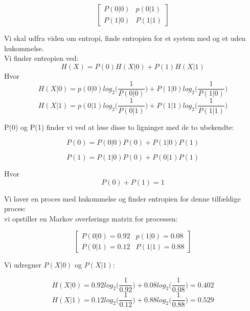 \[ \left[ \begin{array}{ccc}
P(0|0) & p(0|1)  \\
P(1|0) & P(1|1) \end{array} \right]\] 

Vi skal udfra viden om entropi, finde entropien for et system med og et uden hukommelse.\\
Vi finder entropien ved:
\begin{equation}
H(X) = P(0)H(X|0)+P(1)H(X|1)
\end{equation}
Hvor
\begin{equation}
H(X|0)=p(0|0)log_2 \bigg(\frac{1}{P(0|0)}\bigg)+P(1|0)log_2\bigg(\frac{1}{P(1|0)}\bigg)
\end{equation}
\begin{equation}
H(X|1)=p(0|1)log_2 \bigg(\frac{1}{P(0|1)}\bigg)+P(1|1)log_2\bigg(\frac{1}{P(1|1)}\bigg)
\end{equation}

P(0) og P(1) finder vi ved at løse disse to ligninger med de to ubekendte:

\begin{equation}
P(0) = P(0|0)P(0)+P(1|0)P(1)
\end{equation}

\begin{equation}
P(1)=P(1|0)P(0)+P(0|1)P(1)
\end{equation}

Hvor
\begin{equation}
P(0)+P(1)=1
\end{equation}

Vi laver en proces med hukommelse og finder entropien for denne tilfældige proces:\\ vi opstiller en Markov overførings matrix for processen:

\[ \left[ \begin{array}{ccc}
P(0|0) = 0.92 & p(1|0) = 0.08   \\
P(0|1) = 0.12  & P(1|1) = 0.88  \end{array} \right]\] 

Vi udregner $P(X|0)$ og $P(X|1)$:

\begin{equation}
H(X|0)=0.92log_2 \bigg(\frac{1}{0.92}\bigg)+0.08log_2\bigg(\frac{1}{0.08}\bigg) = 0.402
\end{equation}
\begin{equation}
H(X|1)=0.12log_2 \bigg(\frac{1}{0.12}\bigg)+0.88log_2\bigg(\frac{1}{0.88}\bigg) = 0.529
\end{equation}

